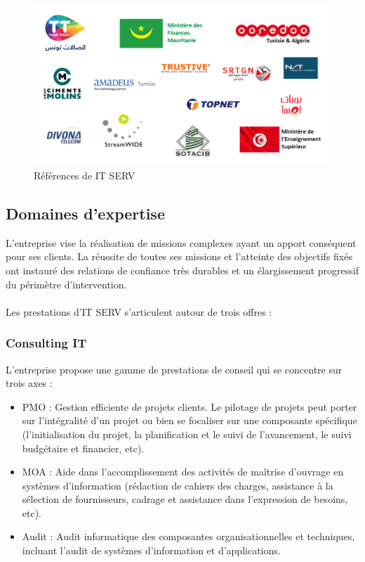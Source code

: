 \begin{spacing}{1.5}
\begin{figure}[!ht]
\centering
\includegraphics[width=1\linewidth]{references.png}
\caption{Références de IT SERV}
\label{fig:references}
\end{figure}

\subsection{Domaines d'expertise}
L'entreprise vise la réalisation de missions complexes ayant un apport conséquent pour ses clients. La réussite de toutes ses missions et l'atteinte des objectifs fixés ont instauré des relations de confiance très durables et un élargissement progressif du périmètre d'intervention.\\
\\
Les prestations d'IT SERV s'articulent autour de trois offres :
\subsubsection*{Consulting IT} %
L'entreprise propose une gamme de prestations de conseil qui se concentre sur trois axes :
\begin{itemize}
    \item PMO : Gestion efficiente de projets clients. Le pilotage de projets peut porter sur l’intégralité d’un projet ou bien se focaliser sur une composante spécifique (l’initialisation du projet, la planification et le suivi de l’avancement, le suivi budgétaire et financier, etc).
    \item MOA : Aide dans l’accomplissement des activités de maîtrise d’ouvrage en systèmes d’information (rédaction de cahiers des charges, assistance à la sélection de fournisseurs, cadrage et assistance dans l’expression de besoins, etc).
    \item Audit : Audit informatique des composantes organisationnelles et techniques, incluant l'audit de systèmes d’information et d'applications.
\end{itemize}

\end{spacing}
